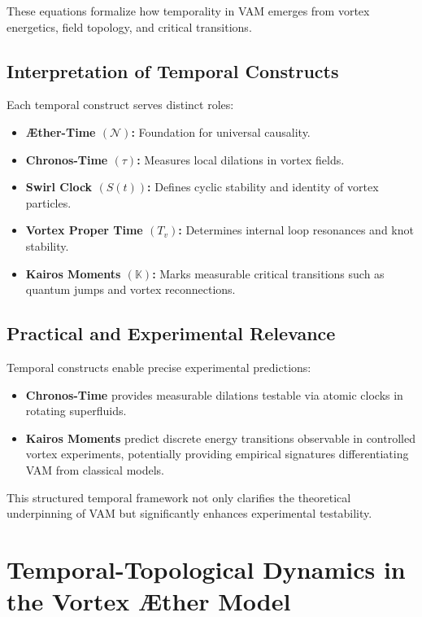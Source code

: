 These equations formalize how temporality in VAM emerges from vortex energetics, field topology, and critical transitions.

\subsection{Interpretation of Temporal Constructs}

Each temporal construct serves distinct roles:
\begin{itemize}
    \item \textbf{Æther-Time $(\mathcal{N})$:} Foundation for universal causality.
    \item \textbf{Chronos-Time $(\tau)$:} Measures local dilations in vortex fields.
    \item \textbf{Swirl Clock $(S(t))$:} Defines cyclic stability and identity of vortex particles.
    \item \textbf{Vortex Proper Time $(T_v)$:} Determines internal loop resonances and knot stability.
    \item \textbf{Kairos Moments $(\mathbb{K})$:} Marks measurable critical transitions such as quantum jumps and vortex reconnections.
\end{itemize}

\subsection{Practical and Experimental Relevance}

Temporal constructs enable precise experimental predictions:
\begin{itemize}
    \item \textbf{Chronos-Time} provides measurable dilations testable via atomic clocks in rotating superfluids.
    \item \textbf{Kairos Moments} predict discrete energy transitions observable in controlled vortex experiments, potentially providing empirical signatures differentiating VAM from classical models.
\end{itemize}

This structured temporal framework not only clarifies the theoretical underpinning of VAM but significantly enhances experimental testability.


\section{Temporal-Topological Dynamics in the Vortex Æther Model}


